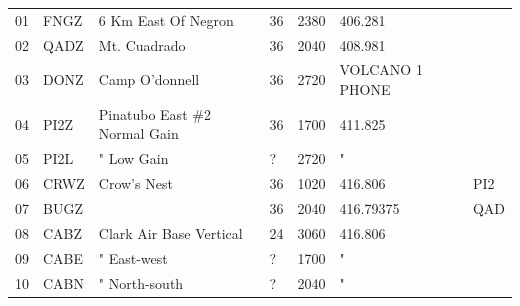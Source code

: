 {\begin{longtable}{lllllll}
01 & FNGZ & 6 Km East Of Negron & 36 & 2380 & 406.281 & \\
02 & QADZ & Mt. Cuadrado & 36 & 2040 & 408.981 & \\
03 & DONZ & Camp O'donnell & 36 & 2720 & VOLCANO 1 PHONE & \\
04 & PI2Z & Pinatubo East \#2 Normal Gain & 36 & 1700 & 411.825 & \\
05 & PI2L & " Low Gain & ? & 2720 & " & \\
06 & CRWZ & Crow's Nest & 36 & 1020 & 416.806 & PI2\\
07 & BUGZ &  & 36 & 2040 & 416.79375 & QAD\\
08 & CABZ & Clark Air Base Vertical & 24 & 3060 & 416.806 & \\
09 & CABE & " East-west & ? & 1700 & " & \\
10 & CABN & " North-south & ? & 2040 & " & \\
\end{longtable}
}
